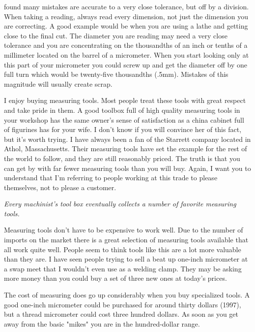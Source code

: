 found many mistakes are accurate to a very close tolerance, but off by a
division. When taking a reading, always read every dimension, not just the
dimension you are correcting. A good example would be when you are using a lathe
and getting close to the final cut. The diameter you are reading may need a very
close tolerance and you are concentrating on the thousandths of an inch or
tenths of a millimeter located on the barrel of a micrometer. When you start
looking only at this part of your micrometer you could screw up and get the
diameter off by one full turn which would be twenty-five thousandths (.5mm).
Mistakes of this magnitude will usually create scrap.


I enjoy buying measuring tools. Most people treat these tools with great respect
and take pride in them. A good toolbox full of high quality measuring tools in
your workshop has the same owner's sense of satisfaction as a china cabinet full
of figurines has for your wife. I don't know if you will convince her of this
fact, but it's worth trying. I have always been a fan of the Starrett company
located in Athol, Massachusetts. Their measuring tools have set the example for
the rest of the world to follow, and they are still reasonably priced. The truth
is that you can get by with far fewer measuring tools than you will buy. Again,
I want you to understand that I'm referring to people working at this trade to
please themselves, not to please a customer.

\bigskip
\textit{Every machinist's tool box eventually collects a number of favorite
measuring tools.}
\bigskip

Measuring tools don't have to be expensive to work well. Due to the number of
imports on the market there is a great selection of measuring tools available
that all work quite well. People seem to think tools like this are a lot more
valuable than they are. I have seen people trying to sell a beat up one-inch
micrometer at a swap meet that I wouldn't even use as a welding clamp. They may
be asking more money than you could buy a set of three new ones at today's
prices.

The cost of measuring does go up considerably when you buy specialized tools. A
good one-inch micrometer could be purchased for around thirty dollars (1997),
but a thread micrometer could cost three hundred dollars. As soon as you get
away from the basic "mikes" you are in the hundred-dollar range.

